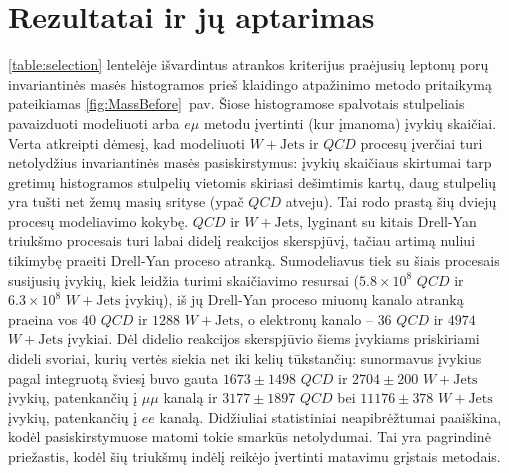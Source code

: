 \documentclass[a4paper, 12pt, oneside]{article}
\newcommand{\emu}{e\mu}
\newcommand{\WJets}{W\! +\!\mathrm{Jets}}
\newcommand{\QCD}{QC\! D}
\begin{document}
\section{Rezultatai ir jų aptarimas}\label{sec:results}
\ref{table:selection} lentelėje išvardintus atrankos kriterijus praėjusių leptonų porų invariantinės masės histogramos
prieš klaidingo atpažinimo metodo pritaikymą pateikiamas \ref{fig:MassBefore}~pav.
Šiose histogramose spalvotais stulpeliais pavaizduoti modeliuoti arba $\emu$ metodu įvertinti (kur įmanoma) įvykių skaičiai.
Verta atkreipti dėmesį, kad modeliuoti $\WJets$ ir $\QCD$ procesų įverčiai turi netolydžius invariantinės masės pasiskirstymus:
įvykių skaičiaus skirtumai tarp gretimų histogramos stulpelių vietomis skiriasi dešimtimis kartų, daug stulpelių yra tušti
net žemų masių srityse (ypač $\QCD$ atveju).
Tai rodo prastą šių dviejų procesų modeliavimo kokybę.
$\QCD$ ir $\WJets$, lyginant su kitais Drell-Yan triukšmo procesais turi labai didelį reakcijos skerspjūvį, tačiau artimą
nuliui tikimybę praeiti Drell-Yan proceso atranką.
Sumodeliavus tiek su šiais procesais susijusių įvykių, kiek leidžia turimi skaičiavimo resursai ($5.8\!\times\!10^8$ $\QCD$ ir
$6.3\!\times\!10^8$ $\WJets$ įvykių), iš jų Drell-Yan proceso miuonų kanalo atranką praeina vos $40$ $\QCD$ ir $1288$ $\WJets$,
o elektronų kanalo -- $36$ $\QCD$ ir $4974$ $\WJets$ įvykiai.
Dėl didelio reakcijos skerspjūvio šiems įvykiams priskiriami dideli svoriai, kurių vertės siekia net iki kelių tūkstančių:
sunormavus įvykius pagal integruotą šviesį buvo gauta $1673\pm1498$ $\QCD$ ir $2704\pm200$ $\WJets$ įvykių, patenkančių į
$\mu\mu$ kanalą ir $3177\pm1897$ $\QCD$ bei $11176\pm378$ $\WJets$ įvykių, patenkančių į $ee$ kanalą. 
Didžiuliai statistiniai neapibrėžtumai paaiškina, kodėl pasiskirstymuose matomi tokie smarkūs netolydumai.
Tai yra pagrindinė priežastis, kodėl šių triukšmų indėlį reikėjo įvertinti matavimu grįstais metodais.
\end{document}
